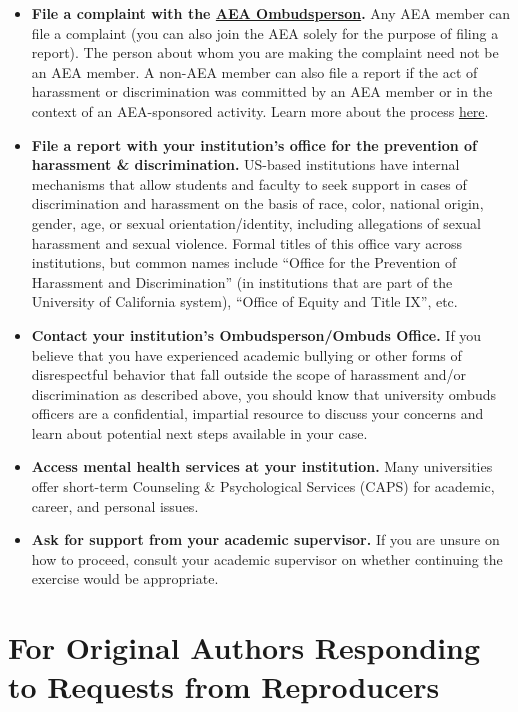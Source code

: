 \documentclass[]{book}
\providecommand{\tightlist}{%
  \setlength{\itemsep}{0pt}\setlength{\parskip}{0pt}}
\begin{document}
\begin{itemize}
\tightlist
\item
  \textbf{File a complaint with the \href{https://www.aeaweb.org/about-aea/aea-ombudsperson}{AEA Ombudsperson}.} Any AEA member can file a complaint (you can also join the AEA solely for the purpose of filing a report). The person about whom you are making the complaint need not be an AEA member. A non-AEA member can also file a report if the act of harassment or discrimination was committed by an AEA member or in the context of an AEA-sponsored activity. Learn more about the process \href{https://www.aeaweb.org/about-aea/aea-ombudsperson/faq}{here}.
\item
  \textbf{File a report with your institution's office for the prevention of harassment \& discrimination.} US-based institutions have internal mechanisms that allow students and faculty to seek support in cases of discrimination and harassment on the basis of race, color, national origin, gender, age, or sexual orientation/identity, including allegations of sexual harassment and sexual violence. Formal titles of this office vary across institutions, but common names include ``Office for the Prevention of Harassment and Discrimination'' (in institutions that are part of the University of California system), ``Office of Equity and Title IX'', etc.
\item
  \textbf{Contact your institution's Ombudsperson/Ombuds Office.} If you believe that you have experienced academic bullying or other forms of disrespectful behavior that fall outside the scope of harassment and/or discrimination as described above, you should know that university ombuds officers are a confidential, impartial resource to discuss your concerns and learn about potential next steps available in your case.
\item
  \textbf{Access mental health services at your institution.} Many universities offer short-term Counseling \& Psychological Services (CAPS) for academic, career, and personal issues.
\item
  \textbf{Ask for support from your academic supervisor.} If you are unsure on how to proceed, consult your academic supervisor on whether continuing the exercise would be appropriate.
\end{itemize}

\hypertarget{for-original-authors-responding-to-requests-from-reproducers}{%
\section{For Original Authors Responding to Requests from Reproducers}\label{for-original-authors-responding-to-requests-from-reproducers}}
\end{document}
